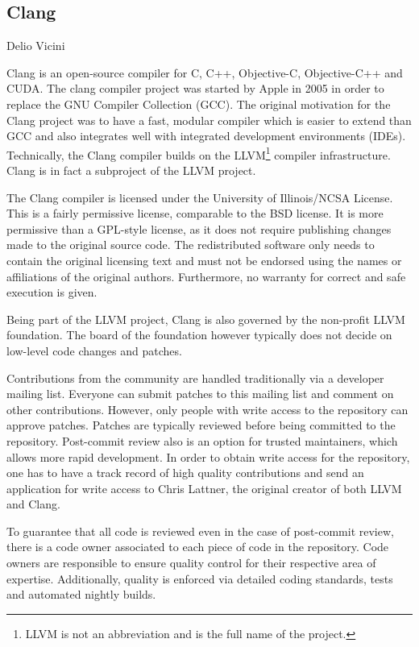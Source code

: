 \subsection{Clang}{Delio Vicini}

Clang is an open-source compiler for C, C++, Objective-C, Objective-C++ and CUDA. The clang compiler project was started by Apple in 2005 in order to replace the GNU Compiler Collection (GCC). The original motivation for the Clang project was to have a fast, modular compiler which is easier to extend
than GCC and also integrates well with integrated development environments (IDEs). \cite{clang-motivation} Technically, the Clang compiler builds on the LLVM\footnote{LLVM is not an abbreviation and is the full name of the project.} compiler infrastructure. Clang is in fact a subproject of the LLVM project.

The Clang compiler is licensed under the University of Illinois/NCSA License. \cite{clang-policy} This is a fairly permissive license, comparable to the BSD license. It is more permissive than a GPL-style license, as it does not require publishing changes made to the original source code. The redistributed software only needs to contain the original licensing text and must 
not be endorsed using the names or affiliations of the original authors. Furthermore, no warranty for correct and safe execution is given. \cite{illinois-license}

Being part of the LLVM project, Clang is also governed by the non-profit LLVM foundation.\cite{llvm-foundation} The board of the foundation however typically does not decide on low-level code changes and patches. 

Contributions from the community are handled traditionally via a developer mailing list. Everyone can submit patches to this mailing list and comment on other contributions. However, only people with write access to the repository can approve patches. Patches are typically reviewed before being committed to the repository. Post-commit review also is an option for trusted maintainers, which allows more rapid development. In order to obtain write access for the repository, one has to have a track record of high quality contributions and send an application for write access to Chris Lattner, the original creator of both LLVM and Clang. 

To guarantee that all code is reviewed even in the case of post-commit review, there is a code owner associated to each piece of code in the repository. Code owners are responsible to ensure quality control for their respective area of expertise. Additionally, quality is enforced via detailed coding standards, tests and automated nightly builds.

